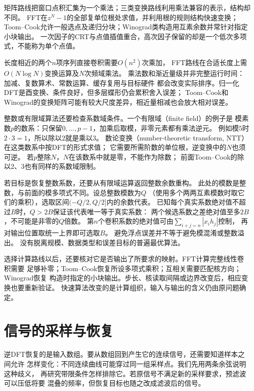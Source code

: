 矩阵路线把窗口点积汇集为一个乘法；三类变换路线利用乘法兼容的表示，结构却不同。
FFT在$z^N-1$的全部复单位根处求值，并利用根的规则结构快速变换；
Toom--Cook允许一般选点及递归分块；Winograd类构造用互素余数并常针对指定小块输出。
一次因子的CRT与点值插值重合，高次因子保留的却是一个低次多项式，不能称为单个点值。

长度相近的两个$n$项序列直接卷积需要$O(n^2)$次乘加，
FFT路线在合适长度上需$O(N\log N)$变换运算及$N$次频域乘法。
乘法数和渐近量级并非完整运行时间：加减、复数算术、常数运算、缓存复用与目标硬件
都会改变实际排序。归一化DFT是酉变换、条件良好，但多层蝶形仍会累积舍入误差；
Toom--Cook和Winograd的变换矩阵可能有较大尺度差异，相近量相减也会放大相对误差。

整数或有限域算法还要检查系数域条件。一个有限域（finite field）的例子是
模素数$p$的数系：只保留$0,\ldots,p-1$，加乘后取模，非零元素都有乘法逆元。
例如模$5$时$2\cdot3=1$，所以除以$2$就是乘以$3$。
数论变换（number-theoretic transform, NTT）在这类数系中按DFT的形式求值；
它需要所需阶数的单位根，逆变换中的$N$也须可逆。
若$p$整除$N$，$N$在该数系中就是零，不能作为除数；
前面Toom--Cook的除以$2$、$3$也有同样的系数域限制。

若目标是恢复整数系数，还要从有限域运算返回整数余数重构。
此处的模数是整数，与前面的模多项式不同。设总整数模数为$Q$
（使用多个两两互素模数时取它们的乘积），选取区间$(-Q/2,Q/2]$内的余数代表。
已知每个真实系数绝对值不超过$B$时，$Q>2B$保证该代表唯一等于真实系数：
两个候选系数之差绝对值至多$2B$，不可能是非零的$Q$倍数。
第$n$个卷积系数的绝对值可由$\sum_{i+j=n}|x_i h_j|$控制，
再对输出位置取统一上界即可选取$B$。
避免浮点误差并不等于避免模混淆或整数溢出。
没有脱离规模、数据类型和误差目标的普遍最优算法。

选择计算路线以后，还要核对它是否输出了所要求的映射。FFT计算完整线性卷积需要
足够补零；Toom--Cook恢复所设多项式乘积；互相关需要匹配核方向；Winograd恢复
构造时指定的小块输出。步长、核读取间隔或边界改变后，相应变换也要重新验证。
快速算法改变的是计算组织，输入与输出的含义仍由原问题确定。

\section{信号的采样与恢复}
\label{sec:signal-analysis-sampling}

逆DFT恢复的是输入数组。要从数组回到产生它的连续信号，还需要知道样本之间允许
怎样变化：不同连续曲线可能穿过同一组采样点。我们先用两条余弦说明这种歧义，
再研究带限条件怎样排除它。若原信号不满足新的采样要求，预滤波可以压低将要
混叠的频率，但恢复目标也随之改成滤波后的信号。

